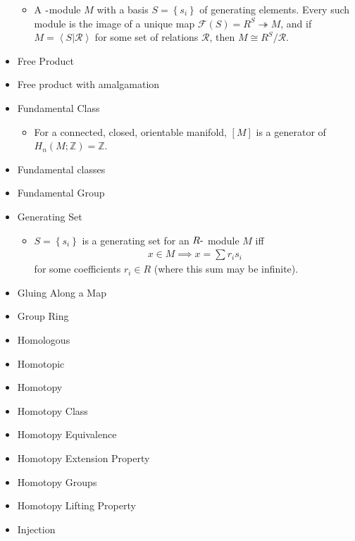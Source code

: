 \begin{itemize}
  \begin{itemize}
  \tightlist
  \item
    A \({\hbox{-}}\)module \(M\) with a basis
    \(S = \left\{{s_i}\right\}\) of generating elements. Every such
    module is the image of a unique map
    \(\mathcal{F}(S) = R^S \twoheadrightarrow M\), and if
    \(M = \left< S \mathrel{\Big|}\mathcal{R} \right>\) for some set of
    relations \(\mathcal{R}\), then \(M \cong R^S / \mathcal{R}\).
  \end{itemize}
\item
  Free Product
\item
  Free product with amalgamation
\item
  Fundamental Class

  \begin{itemize}
  \tightlist
  \item
    For a connected, closed, orientable manifold, \([M]\) is a generator
    of \(H_n(M; {\mathbb{Z}}) = {\mathbb{Z}}\).
  \end{itemize}
\item
  Fundamental classes
\item
  Fundamental Group
\item
  Generating Set

  \begin{itemize}
  \tightlist
  \item
    \(S = \left\{{s_i}\right\}\) is a generating set for an
    \(R{\hbox{-}}\) module \(M\) iff
    \begin{align*}x\in M \implies x = \sum r_i s_i\end{align*}
    for some coefficients \(r_i \in R\) (where this sum may be
    infinite).
  \end{itemize}
\item
  Gluing Along a Map
\item
  Group Ring
\item
  Homologous
\item
  Homotopic
\item
  Homotopy
\item
  Homotopy Class
\item
  Homotopy Equivalence
\item
  Homotopy Extension Property
\item
  Homotopy Groups
\item
  Homotopy Lifting Property
\item
  Injection


\end{itemize}
